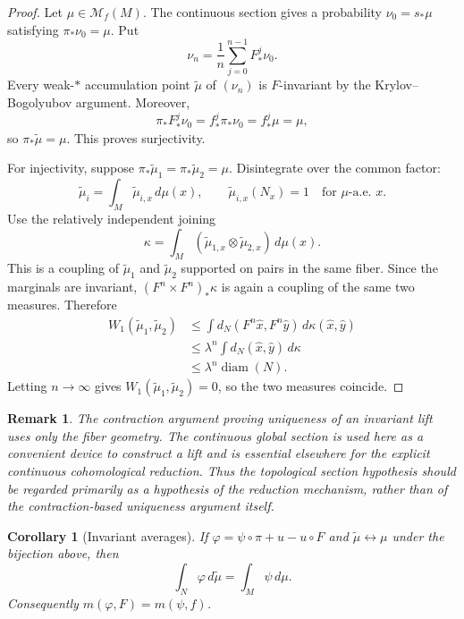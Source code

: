 \documentclass[11pt,a4paper]{article}
\newtheorem{corollary}[theorem]{Corollary}
\newtheorem{remark}[theorem]{Remark}
\newcommand{\M}{\mathcal M}
\newcommand{\diam}{\operatorname{diam}}
\begin{document}
\begin{proof}
Let $\mu\in\M_f(M)$. The continuous section gives a probability
$\nu_0=s_*\mu$ satisfying $\pi_*\nu_0=\mu$. Put
\[
\nu_n=\frac1n\sum_{j=0}^{n-1}F_*^j\nu_0.
\]
Every weak-$*$ accumulation point $\widetilde\mu$ of $(\nu_n)$ is
$F$-invariant by the Krylov--Bogolyubov argument. Moreover,
\[
\pi_*F_*^j\nu_0=f_*^j\pi_*\nu_0=f_*^j\mu=\mu,
\]
so $\pi_*\widetilde\mu=\mu$. This proves surjectivity.

For injectivity, suppose
$\pi_*\widetilde\mu_1=\pi_*\widetilde\mu_2=\mu$. Disintegrate over the
common factor:
\[
\widetilde\mu_i=\int_M\widetilde\mu_{i,x}\,d\mu(x),
\qquad \widetilde\mu_{i,x}(N_x)=1
\quad\text{for $\mu$-a.e. }x.
\]
Use the relatively independent joining
\begin{equation}
\kappa=\int_M
(\widetilde\mu_{1,x}\otimes\widetilde\mu_{2,x})\,d\mu(x).
\label{eq:relative-product}
\end{equation}
This is a coupling of $\widetilde\mu_1$ and $\widetilde\mu_2$ supported on
pairs in the same fiber. Since the marginals are invariant,
$(F^n\times F^n)_*\kappa$ is again a coupling of the same two measures.
Therefore
\begin{align*}
W_1(\widetilde\mu_1,\widetilde\mu_2)
&\le \int d_N(F^n\hat x,F^n\hat y)\,d\kappa(\hat x,\hat y)\\
&\le \lambda^n\int d_N(\hat x,\hat y)\,d\kappa\\
&\le \lambda^n\diam(N).
\end{align*}
Letting $n\to\infty$ gives $W_1(\widetilde\mu_1,\widetilde\mu_2)=0$,
so the two measures coincide.
\end{proof}

\begin{remark}
The contraction argument proving uniqueness of an invariant lift uses only the
fiber geometry. The continuous global section is used here as a convenient
device to construct a lift and is essential elsewhere for the explicit
continuous cohomological reduction. Thus the topological section hypothesis
should be regarded primarily as a hypothesis of the reduction mechanism,
rather than of the contraction-based uniqueness argument itself.
\end{remark}

\begin{corollary}[Invariant averages]
\label{cor:average-correspondence}
If $\varphi=\psi\circ\pi+u-u\circ F$ and
$\widetilde\mu\leftrightarrow\mu$ under the bijection above, then
\begin{equation}
\int_N\varphi\,d\widetilde\mu=\int_M\psi\,d\mu.
\label{eq:average-correspondence-v4}
\end{equation}
Consequently $m(\varphi,F)=m(\psi,f)$.
\end{corollary}
\end{document}
